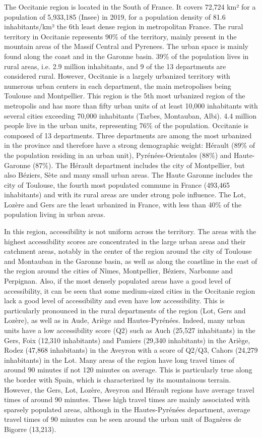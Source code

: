 The Occitanie region is located in the South of France. It covers 72,724 km² for
a population of 5,933,185 (Insee) in 2019, for a population density of 81.6
inhabitants/km² the 6th least dense region in metropolitan France. The rural
territory in Occitanie represents 90\% of the territory, mainly present in the
mountain areas of the Massif Central and Pyrenees. The urban space is mainly
found along the coast and in the Garonne basin. 39\% of the population lives in
rural areas, i.e. 2.9 million inhabitants, and 9 of the 13 departments are
considered rural. However, Occitanie is a largely urbanized territory with
numerous urban centers in each department, the main metropolises being Toulouse
and Montpellier. This region is the 5th most urbanized region of the metropolis
and has more than fifty urban units of at least 10,000 inhabitants with several
cities exceeding 70,000 inhabitants (Tarbes, Montauban, Albi). 4.4 million
people live in the urban units, representing 76\% of the population. Occitanie
is composed of 13 departments. Three departments are among the most urbanized in
the province and therefore have a strong demographic weight: Hérault (89\% of
the population residing in an urban unit), Pyrénées-Orientales (88\%) and
Haute-Garonne (87\%). The Hérault department includes the city of Montpellier,
but also Béziers, Sète and many small urban areas. The Haute Garonne includes
the city of Toulouse, the fourth most populated commune in France (493,465
inhabitants) and with its rural areas are under strong pole influence.  The Lot,
Lozère and Gers are the least urbanized in France, with less than 40\% of the
population living in urban areas.

In this region, accessibility is not uniform across the territory. The areas
with the highest accessibility scores are concentrated in the large urban areas
and their catchment areas, notably in the center of the region around the city
of Toulouse and Montauban in the Garonne basin, as well as along the coastline
in the east of the region around the cities of Nîmes, Montpellier, Béziers,
Narbonne and Perpignan. Also, if the most densely populated areas have a good
level of accessibility, it can be seen that some medium-sized cities in the
Occitanie region lack a good level of accessibility and even have low
accessibility. This is particularly pronounced in the rural departments of the
region (Lot, Gers and Lozère), as well as in Aude, Ariège and Hautes-Pyrénées.
Indeed, many urban units have a low accessibility score (Q2) such as Auch
(25,527 inhabitants) in the Gers, Foix (12,310 inhabitants) and Pamiers (29,340
inhabitants) in the Ariège, Rodez (47,868 inhabitants) in the Aveyron with a
score of Q2/Q3, Cahors (24,279 inhabitants) in the Lot. Many areas of the region
have long travel times of around 90 minutes if not 120 minutes on average. This
is particularly true along the border with Spain, which is characterized by its
mountainous terrain. However, the Gers, Lot, Lozère, Aveyron and Hérault regions
have average travel times of around 90 minutes. These high travel times are
mainly associated with sparsely populated areas, although in the Hautes-Pyrénées
department, average travel times of 90 minutes can be seen around the urban unit
of Bagnères de Bigorre (13,213).

